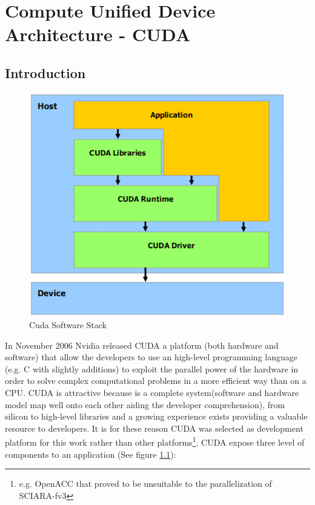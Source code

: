 \chapter{Compute Unified Device Architecture - CUDA }\label{chap:CUDA}
\section{Introduction}
\begin{figure}

\includegraphics[scale=0.23]{./images/cudaArchitecture}
\caption{Cuda Software Stack}\label{CUDA_SOFT_ARCH}
\end{figure}
In November 2006 Nvidia released CUDA a platform (both hardware and software)
that allow the developers to use an high-level programming language
(e.g. C with slightly additions) to exploit the parallel power of the
hardware in order to solve complex computational problems in a more efficient
way than on a CPU. CUDA is attractive because is a complete system(software and
hardware model map well onto each other aiding the developer comprehension),
from silicon to high-level libraries and a growing experience exists providing a valuable resource to developers.
It is for these reason CUDA was selected as development platform for this work
rather than other platforms\footnote{e.g. OpenACC that proved to be
unsuitable to the parallelization of SCIARA-fv3}.
CUDA expose three level of components to an application (See figure
\ref{CUDA_SOFT_ARCH}):
